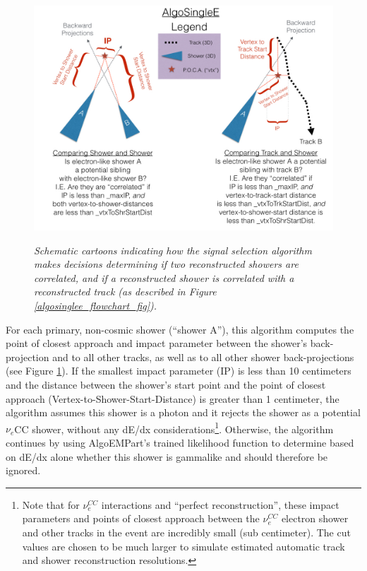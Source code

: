 \begin{figure}[ht!]
\centering
\includegraphics[width=150mm]{Figures/algosinglee_cartoon.png}\\
\caption{\textit{Schematic cartoons indicating how the signal selection algorithm makes decisions determining if two reconstructed showers are correlated, and if a reconstructed shower is correlated with a reconstructed track (as described in Figure \ref{algosinglee_flowchart_fig}).}}
\label{algosinglee_cartoon_fig}
\end{figure}

For each primary, non-cosmic shower (``shower A''), this algorithm computes the point of closest approach and impact parameter between the shower's back-projection and to all other tracks, as well as to all other shower back-projections (see Figure \ref{algosinglee_cartoon_fig}). If the smallest impact parameter (IP) is less than 10 centimeters and the distance between the shower's start point and the point of closest approach (Vertex-to-Shower-Start-Distance) is greater than 1 centimeter, the algorithm assumes this shower is a photon and it rejects the shower as a potential $\nu_e$CC shower, without any dE/dx considerations\footnote{Note that for $\nu_e^{CC}$ interactions and ``perfect reconstruction'', these impact parameters and points of closest approach between the $\nu_e^{CC}$ electron shower and other tracks in the event are incredibly small (sub centimeter). The cut values are chosen to be much larger to simulate estimated automatic track and shower reconstruction resolutions.}. Otherwise, the algorithm continues by using AlgoEMPart's trained likelihood function to determine based on dE/dx alone whether this shower is gammalike and should therefore be ignored.\\

